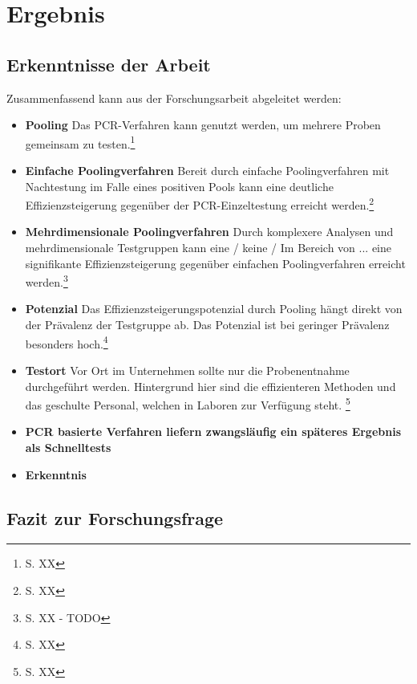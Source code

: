 \chapter{Ergebnis}
\section{Erkenntnisse der Arbeit}
Zusammenfassend kann aus der Forschungsarbeit abgeleitet werden:

\begin{itemize}
	\item \textbf{Pooling} Das PCR-Verfahren kann genutzt werden, um mehrere Proben gemeinsam zu testen.\footnote{S. XX}
	\item \textbf{Einfache Poolingverfahren} Bereit durch einfache Poolingverfahren mit Nachtestung im Falle eines positiven Pools kann eine deutliche Effizienzsteigerung gegenüber der PCR-Einzeltestung erreicht werden.\footnote{S. XX}
	\item \textbf{Mehrdimensionale Poolingverfahren} Durch komplexere Analysen und mehrdimensionale Testgruppen kann eine / keine / Im Bereich von ... eine signifikante Effizienzsteigerung gegenüber einfachen Poolingverfahren erreicht werden.\footnote{S. XX - TODO}
	\item \textbf{Potenzial} Das Effizienzsteigerungspotenzial durch Pooling hängt direkt von der Prävalenz der Testgruppe ab. Das Potenzial ist bei geringer Prävalenz besonders hoch.\footnote{S. XX}
	\item \textbf{Testort} Vor Ort im Unternehmen sollte nur die Probenentnahme durchgeführt werden. Hintergrund hier sind die effizienteren Methoden und das geschulte Personal, welchen in Laboren zur Verfügung steht. \footnote{S. XX}
	\item \textbf{PCR basierte Verfahren liefern zwangsläufig ein späteres Ergebnis als Schnelltests} 
	\item \textbf{Erkenntnis} 
	
\end{itemize}

\cleardoublepage
\section{Fazit zur Forschungsfrage}


